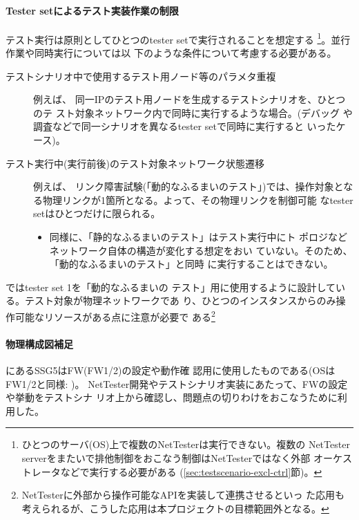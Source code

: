     \paragraph{Tester setによるテスト実装作業の制限}
テスト実行は原則としてひとつのtester setで実行されることを想定する
\footnote{ひとつのサーバ(OS)上で複数のNetTesterは実行できない。複数の
NetTester serverをまたいで排他制御をおこなう制御はNetTesterではなく外部
オーケストレータなどで実行する必要がある
(\ref{sec:testscenario-excl-ctrl}節)。}。並行作業や同時実行については以
下のような条件について考慮する必要がある。
\begin{description}
 \item[テストシナリオ中で使用するテスト用ノード等のパラメタ重複] 例えば、
            同一IPのテスト用ノードを生成するテストシナリオを、ひとつのテ
            スト対象ネットワーク内で同時に実行するような場合。(デバッグ
            や調査などで同一シナリオを異なるtester setで同時に実行すると
            いったケース)。
 \item[テスト実行中(実行前後)のテスト対象ネットワーク状態遷移] 例えば、
            リンク障害試験(「動的なふるまいのテスト」)では、操作対象とな
            る物理リンクが1箇所となる。よって、その物理リンクを制御可能
            なtester setはひとつだけに限られる。
            \begin{itemize}
             \item 同様に、「静的なふるまいのテスト」はテスト実行中にト
                   ポロジなどネットワーク自体の構造が変化する想定をおい
                   ていない。そのため、「動的なふるまいのテスト」と同時
                   に実行することはできない。
            \end{itemize}
\end{description}

ではtester set 1を「動的なふるまいの
テスト」用に使用するように設計している。テスト対象が物理ネットワークであ
り、ひとつのインスタンスからのみ操作可能なリソースがある点に注意が必要で
ある\footnote{NetTesterに外部から操作可能なAPIを実装して連携させるといっ
た応用も考えられるが、こうした応用は本プロジェクトの目標範囲外となる。}

    \paragraph{物理構成図補足}
にあるSSG5はFW(FW1/2)の設定や動作確
認用に使用したものである(OSはFW1/2と同様: )。
NetTester開発やテストシナリオ実装にあたって、FWの設定や挙動をテストシナ
リオ上から確認し、問題点の切りわけをおこなうために利用した。

